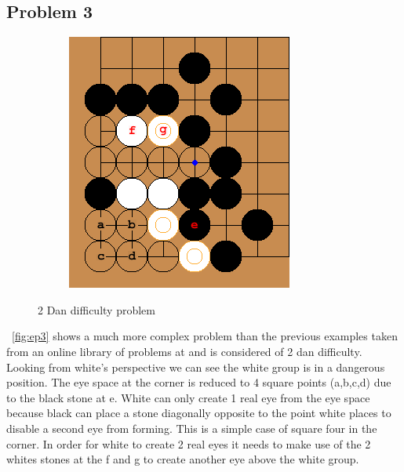 \documentclass{l4proj}
\begin{document}
\subsection{Problem 3}

\begin{figure}[!ht]
\centering
\begin{subfigure}[b]{0.45\textwidth}
\includegraphics[width=\textwidth]{ep3/1.png}
\end{subfigure}
\caption{2 Dan difficulty problem}
\label{fig:ep3}
\end{figure}

~\autoref{fig:ep3} shows a much more complex problem than the previous examples taken from an online library of problems at \cite{GoProblems} and is considered of 2 dan difficulty. Looking from white’s perspective we can see the white group is in a dangerous position. The eye space at the corner is reduced to 4 square points (a,b,c,d) due to the black stone at e. White can only create 1 real eye from the eye space because black can place a stone diagonally opposite to the point white places to disable a second eye from forming. This is a simple case of square four in the corner. In order for white to create 2 real eyes it needs to make use of the 2 whites stones at the f and g to create another eye above the white group.
\end{document}
